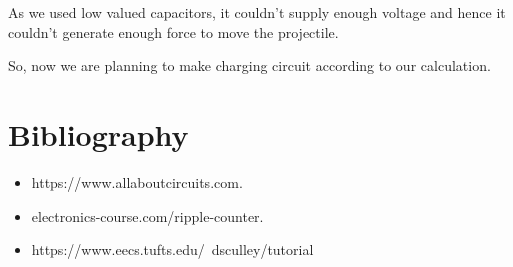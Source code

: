 \documentclass[twoside,twocolumn]{article}
\begin{document}
As we used low valued capacitors, it couldn't supply enough voltage and hence it couldn't generate enough force to move the projectile.

So, now we are planning to make charging circuit according to our calculation.




\section{Bibliography} 
\begin{itemize}
\item https://www.allaboutcircuits.com.

\item electronics-course.com/ripple-counter.

\item https://www.eecs.tufts.edu/~dsculley/tutorial

\end{itemize}
\end{document}
